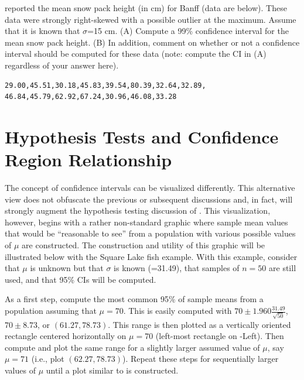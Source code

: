\documentclass[10pt,openany]{book}\usepackage[]{graphicx}\usepackage[]{color}
\begin{document}
\begin{exsection}
  \item \label{revex:CIsnow} \rhw{} \cite{Hebblewhite2000} reported the mean snow pack height (in cm) for Banff (data are below).  These data were strongly right-skewed with a possible outlier at the maximum.  Assume that it is known that $\sigma$=15 cm.  (A) Compute a 99\% confidence interval for the mean snow pack height.  (B) In addition, comment on whether or not a confidence interval should be computed for these data (note: compute the CI in (A) regardless of your answer here). 
  \begin{Verbatim}
29.00,45.51,30.18,45.83,39.54,80.39,32.64,32.89,
46.84,45.79,62.92,67.24,30.96,46.08,33.28
  \end{Verbatim}
\end{exsection}


\section[Inference Type Relationship]{Hypothesis Tests and Confidence Region Relationship}
The concept of confidence intervals can be visualized differently.  This alternative view does not obfuscate the previous or subsequent discussions and, in fact, will strongly augment the hypothesis testing discussion of .  This visualization, however, begins with a rather non-standard graphic where sample mean values that would be ``reasonable to see'' from a population with various possible values of $\mu$ are constructed.  The construction and utility of this graphic will be illustrated below with the Square Lake fish example.  With this example, consider that $\mu$ is unknown but that $\sigma$ is known (=31.49), that samples of $n=50$ are still used, and that 95\% CIs will be computed.

As a first step, compute the most common 95\% of sample means from a population assuming that $\mu=70$.  This is easily computed with $70 \pm 1.960\frac{31.49}{\sqrt{50}}$, $70 \pm 8.73$, or $(61.27,78.73)$.  This range is then plotted as a vertically oriented rectangle centered horizontally on $\mu=70$ (left-most rectangle on -Left).  Then compute and plot the same range for a slightly larger assumed value of $\mu$, say $\mu=71$ (i.e., plot $(62.27,78.73)$).  Repeat these steps for sequentially larger values of $\mu$ until a plot similar to  is constructed.
\end{document}
